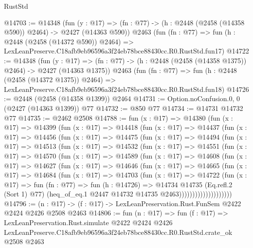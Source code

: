 \begin{lexlean}{RustStd}
\begin{coremodule}
@14703 := @14348
    (fun (y : @17) => (fn : @77) -> (h : @2448 (@2458 (@14358 @590)) @2464) -> @2427 (@14363 @590))
    @2463
    (fun (fn : @77) =>
    fun (h : @2448 (@2458 (@14372 @590)) @2464) =>
    LexLeanPreserve.C18afb9eb96596a3f24eb78bce88430cc.R0.RustStd.fun17)
@14722 := @14348
    (fun (y : @17) =>
    (fn : @77) -> (h : @2448 (@2458 (@14358 @1375)) @2464) -> @2427 (@14363 @1375))
    @2463
    (fun (fn : @77) =>
    fun (h : @2448 (@2458 (@14372 @1375)) @2464) =>
    LexLeanPreserve.C18afb9eb96596a3f24eb78bce88430cc.R0.RustStd.fun18)
@14726 := @2448 (@2458 (@14358 @1399)) @2464
@14731 := Option.noConfusion.{0, 0} (@2427 (@14363 @1399)) @77
@14732 := @850 @77
@14734 := @14731 @14732 @77
@14735 := @2462 @2508
@14788 := fun (x : @17) =>
  @14380
    (fun (x : @17) =>
    @14399
      (fun (x : @17) =>
      @14418
        (fun (x : @17) =>
        @14437
          (fun (x : @17) =>
          @14456
            (fun (x : @17) =>
            @14475
              (fun (x : @17) =>
              @14494
                (fun (x : @17) =>
                @14513
                  (fun (x : @17) =>
                  @14532
                    (fun (x : @17) =>
                    @14551
                      (fun (x : @17) =>
                      @14570
                        (fun (x : @17) =>
                        @14589
                          (fun (x : @17) =>
                          @14608
                            (fun (x : @17) =>
                            @14627
                              (fun (x : @17) =>
                              @14646
                                (fun (x : @17) =>
                                @14665
                                  (fun (x : @17) =>
                                  @14684
                                    (fun (x : @17) =>
                                    @14703
                                      (fun (x : @17) =>
                                      @14722
                                        (fun (x : @17) =>
                                        fun (fn : @77) =>
                                        fun (h : @14726) =>
                                        @14734
                                          @14735
                                          (Eq.refl.{2} (Sort 1) @77)
                                          (heq_of_eq.{1}
                                            @2447
                                            @14732
                                            @14735
                                            @2463))))))))))))))))))))
@14796 := (n : @17) -> (f : @17) -> LexLeanPreservation.Rust.FunSem @2422 @2424 @2426 @2508 @2463
@14806 := fun (n : @17) =>
  fun (f : @17) =>
  LexLeanPreservation.Rust.simulate
    @2422
    @2424
    @2426
    LexLeanPreserve.C18afb9eb96596a3f24eb78bce88430cc.R0.RustStd.crate_ok
    @2508
    @2463
\end{coremodule}
\end{lexlean}
